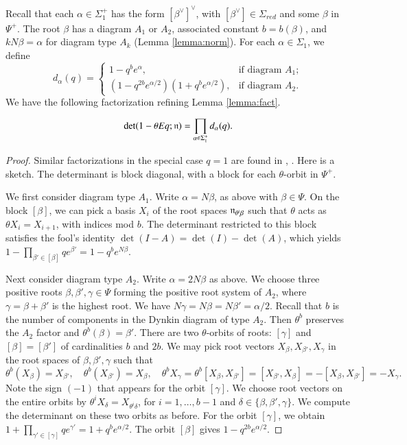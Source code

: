 Recall that each $\alpha\in \Sigma^+_1$ has the form
$[\beta^\vee]^\vee$, with $[\beta^\vee]\in \Sigma_{red}$ and some
$\beta$ in $\Psi^+$.  The root $\beta$ has a diagram $A_1$ or $A_2$,
associated constant $b=b(\beta)$, and $k N\beta = \alpha$ for diagram
type $A_k$ (Lemma \ref{lemma:norm}).  For each $\alpha\in \Sigma_1$,
we define
\begin{equation}\label{eqn:d}
d_\alpha(q) =
\begin{cases} {1-q^b e^\alpha},    &\text{if diagram } A_1;\\
{(1-q^{2b} e^{\alpha/2})(1+q^b e^{\alpha/2})},
&\text{if diagram } A_2.
\end{cases}
\end{equation}
We have the following factorization refining Lemma \ref{lemma:fact}.

\begin{lemma} \label{lemma:prod}
\[
\det(1-\theta  E q ;{\mathfrak n}) = \prod_{\alpha\in\Sigma^+_1} d_\alpha(q).
\]
\end{lemma}

\begin{proof} Similar factorizations in the special case $q=1$ are
  found in \cite{jantzen1977darstellungen}, \cite{wendt2001weyl}.
  Here is a sketch.  The determinant is block diagonal, with a block
  for each $\theta$-orbit in $\Psi^+$.

  We first consider diagram type $A_1$.  Write $\alpha = N\beta$, as
  above with $\beta\in\Psi$.  On the block $[\beta]$, we can pick a
  basis $X_i$ of the root spaces ${\mathfrak n}_{\theta^i\beta}$ such that
  $\theta$ acts as $\theta X_i = X_{i+1}$, with indices mod $b$.  The
  determinant restricted to this block satisfies the fool's identity
  $\det(I-A) = \det(I)-\det(A)$, which yields $1- \prod_{\beta'\in
    [\beta]} {q e^{\beta'}} = 1- q^b e^{N \beta}$.

  Next consider diagram type $A_2$.  Write $\alpha = 2N\beta$ as
  above.  We choose three positive roots $\beta,\beta',\gamma\in\Psi$
  forming the positive root system of $A_2$, where
  $\gamma=\beta+\beta'$ is the highest root.  We have
  $N\gamma=N\beta=N\beta'=\alpha/2$.  Recall that $b$ is the number of
  components in the Dynkin diagram of type $A_2$.  Then $\theta^b$
  preserves the $A_2$ factor and $\theta^b(\beta)=\beta'$.  There are
  two $\theta$-orbits of roots: $[\gamma]$ and $[\beta]=[\beta']$ of
  cardinalities $b$ and $2b$.  We may pick root vectors
  $X_{\beta},X_{\beta'},X_{\gamma}$ in the root spaces of
  $\beta,\beta',\gamma$ such that
\[
\theta^b(X_\beta)= X_{\beta'},\quad \theta^b(X_{\beta'})=X_\beta,\quad
\theta^b X_\gamma = \theta^b [X_\beta,X_{\beta'}] 
= [X_{\beta'},X_\beta] = -[X_\beta,X_{\beta'}] = -X_\gamma.
\]
Note the sign $(-1)$ that appears for the orbit $[\gamma]$.  We choose
root vectors on the entire orbits by $\theta^i X_\delta=X_{\theta^i
  \delta}$, for $i=1,\ldots,b-1$ and
$\delta\in\{\beta,\beta',\gamma\}$.  We compute the determinant on
these two orbits as before.  For the orbit $[\gamma]$, we obtain
$1+\prod_{\gamma'\in [\gamma]} {q e^{\gamma'}} = 1+ q^b e^{\alpha/2}$.
The orbit $[\beta]$ gives $1-q^{2b} e^{\alpha/2}$.
\end{proof}

